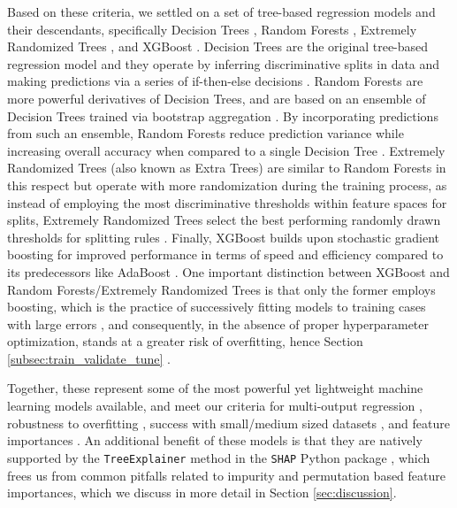 \documentclass[fleqn,usenatbib]{mnras}
\begin{document}
Based on these criteria, we settled on a set of tree-based regression models and their descendants, specifically Decision Trees \citep{breiman1984original}, Random Forests \citep{breiman2001random}, Extremely Randomized Trees \citep{extratrees}, and XGBoost \citep{xgboost}. Decision Trees are the original tree-based regression model and they operate by inferring discriminative splits in data and making predictions via a series of if-then-else decisions \citep{breiman1984original}. Random Forests are more powerful derivatives of Decision Trees, and are based on an ensemble of Decision Trees trained via bootstrap aggregation \citep{breiman1996bagging,breiman2001random}. By incorporating predictions from such an ensemble, Random Forests reduce prediction variance while increasing overall accuracy when compared to a single Decision Tree \citep{lakshminarayanan2016decision}. Extremely Randomized Trees (also known as Extra Trees) are similar to Random Forests in this respect but operate with more randomization during the training process, as instead of employing the most discriminative thresholds within feature spaces for splits, Extremely Randomized Trees select the best performing randomly drawn thresholds for splitting rules \citep{extratrees,scikit-learn}. Finally, XGBoost builds upon stochastic gradient boosting for improved performance in terms of speed and efficiency compared to its predecessors like AdaBoost \citep{xgboost,xgboost_vs_ada}. One important distinction between XGBoost and Random Forests/Extremely Randomized Trees is that only the former employs boosting, which is the practice of successively fitting models to training cases with large errors \citep{Stochasticgradientboosting}, and consequently, in the absence of proper hyperparameter optimization, stands at a greater risk of overfitting, hence Section \ref{subsec:train_validate_tune} \citep{bruce2017practical}.

Together, these represent some of the most powerful yet lightweight machine learning models available, and meet our criteria for multi-output regression \citep{multioutput_review}, robustness to overfitting \citep{metarandomforests,evalTree-BasedEnsembles}, success with small/medium sized datasets \citep{floares2017smallest}, and feature importances \citep{feature_importances_trees}. An additional benefit of these models is that they are natively supported by the \texttt{TreeExplainer} method in the \texttt{SHAP} Python package \citep{SHAP_2017}, which frees us from common pitfalls related to impurity and permutation based feature importances, which we discuss in more detail in Section \ref{sec:discussion}. 
\end{document}
